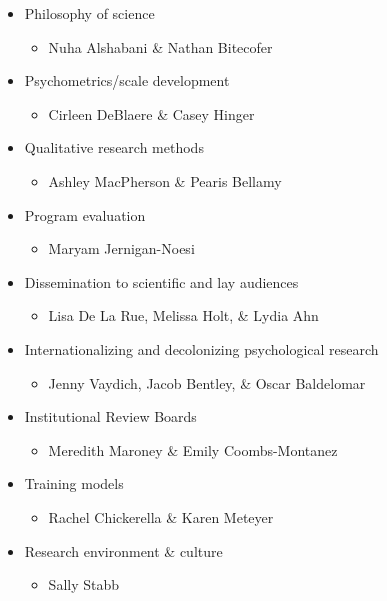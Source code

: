 \documentclass[
  11pt,
]{book}
\providecommand{\tightlist}{%
  \setlength{\itemsep}{0pt}\setlength{\parskip}{0pt}}
\begin{document}
\begin{itemize}
\tightlist
\item
  Philosophy of science

  \begin{itemize}
  \tightlist
  \item
    Nuha Alshabani \& Nathan Bitecofer
  \end{itemize}
\item
  Psychometrics/scale development

  \begin{itemize}
  \tightlist
  \item
    Cirleen DeBlaere \& Casey Hinger
  \end{itemize}
\item
  Qualitative research methods

  \begin{itemize}
  \tightlist
  \item
    Ashley MacPherson \& Pearis Bellamy
  \end{itemize}
\item
  Program evaluation

  \begin{itemize}
  \tightlist
  \item
    Maryam Jernigan-Noesi
  \end{itemize}
\item
  Dissemination to scientific and lay audiences

  \begin{itemize}
  \tightlist
  \item
    Lisa De La Rue, Melissa Holt, \& Lydia Ahn
  \end{itemize}
\item
  Internationalizing and decolonizing psychological research

  \begin{itemize}
  \tightlist
  \item
    Jenny Vaydich, Jacob Bentley, \& Oscar Baldelomar
  \end{itemize}
\item
  Institutional Review Boards

  \begin{itemize}
  \tightlist
  \item
    Meredith Maroney \& Emily Coombs-Montanez
  \end{itemize}
\item
  Training models

  \begin{itemize}
  \tightlist
  \item
    Rachel Chickerella \& Karen Meteyer
  \end{itemize}
\item
  Research environment \& culture

  \begin{itemize}
  \tightlist
  \item
    Sally Stabb
  \end{itemize}
\end{itemize}
\end{document}
